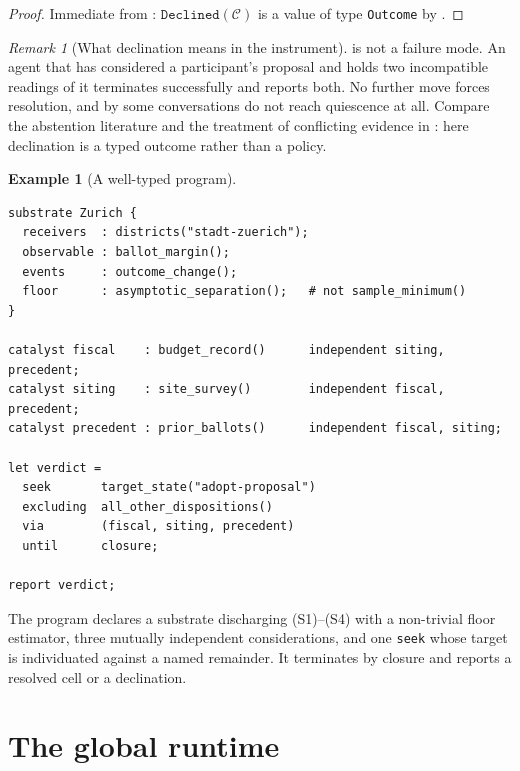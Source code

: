 \documentclass[11pt,a4paper]{article}
\theoremstyle{clstyle}
\theoremstyle{definition}
\newtheorem{example}[theorem]{Example}
\theoremstyle{remark}
\newtheorem{remark}[theorem]{Remark}
\begin{document}
\begin{proof}
Immediate from : $\texttt{Declined}(\mathcal{C})$ is a
value of type \texttt{Outcome} by .
\end{proof}

\begin{remark}[What declination means in the instrument]
\label{rem:decline-meaning}
 is not a failure mode. An agent that has considered a
participant's proposal and holds two incompatible readings of it terminates
successfully and reports both. No further move forces resolution, and by
 some conversations do not reach quiescence at all.
Compare the abstention literature \citep{chow1970optimum,vovk2005algorithmic}
and the treatment of conflicting evidence in \citet{shafer1976mathematical}:
here declination is a typed outcome rather than a policy.
\end{remark}

\begin{example}[A well-typed program]
\label{ex:program}
\begin{lstlisting}[style=clostyle]
substrate Zurich {
  receivers  : districts("stadt-zuerich");
  observable : ballot_margin();
  events     : outcome_change();
  floor      : asymptotic_separation();   # not sample_minimum()
}

catalyst fiscal    : budget_record()      independent siting, precedent;
catalyst siting    : site_survey()        independent fiscal, precedent;
catalyst precedent : prior_ballots()      independent fiscal, siting;

let verdict =
  seek       target_state("adopt-proposal")
  excluding  all_other_dispositions()
  via        (fiscal, siting, precedent)
  until      closure;

report verdict;
\end{lstlisting}
The program declares a substrate discharging (S1)--(S4) with a non-trivial
floor estimator, three mutually independent considerations, and one
\texttt{seek} whose target is individuated against a named remainder. It
terminates by closure and reports a resolved cell or a declination.
\end{example}

\section{The global runtime}
\label{sec:runtime}
\end{document}
